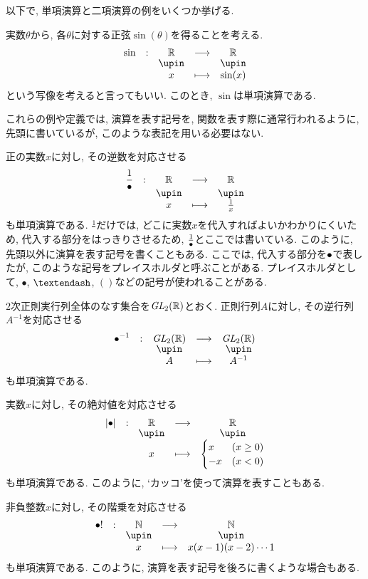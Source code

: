 以下で, 単項演算と二項演算の例をいくつか挙げる.
\begin{example}
  実数$\theta$から,
  各$\theta$に対する正弦$\sin(\theta)$を得ることを考える.
  \begin{align*}
    \shazo{\sin}
          {\RR}{\RR}
          {x}{\sin(x)}
  \end{align*}
  という写像を考えると言ってもいい.
  このとき, $\sin$は単項演算である.  
\end{example}
これらの例や定義では, 演算を表す記号を,
関数を表す際に通常行われるように,
先頭に書いているが,
このような表記を用いる必要はない.
\begin{example}
  正の実数$x$に対し, その逆数を対応させる
  \begin{align*}
    \shazo{\frac{1}{\tofu}}
          {\RR}{\RR}
          {x}{\frac{1}{x}}
  \end{align*}
  も単項演算である.
  $\frac{1}{}$だけでは, どこに実数$x$を代入すればよいかわかりにくいため,
  代入する部分をはっきりさせるため,
  $\frac{1}{{\bullet}}$とここでは書いている.
  このように, 先頭以外に演算を表す記号を書くこともある.
  ここでは, 代入する部分を${\bullet}$で表したが,
  このような記号をプレイスホルダと呼ぶことがある.
  プレイスホルダとして,
  $\bullet$, $\textendash$, $()$などの記号が使われることがある.
\end{example}
\begin{example}
  $2$次正則実行列全体のなす集合を$\textit{GL}_2(\mathbb{R})$とおく.
  正則行列$A$に対し, その逆行列$A^{-1}$を対応させる
  \begin{align*}
    \shazo{\tofu^{-1}}
          {\GL_2(\RR)}{\GL_2(\RR)}
          {A}{{A}^{-1}}
  \end{align*}
  も単項演算である.
\end{example}
\begin{example}
  実数$x$に対し, その絶対値を対応させる
  \begin{align*}
    \shazo{|\tofu|}
          {\RR}{\RR}
          {x}{\begin{cases}x&(x\geq 0)\\-x&(x<0)\end{cases}}
  \end{align*}
  も単項演算である.
  このように, `カッコ'を使って演算を表すこともある.
\end{example}
\begin{example}
  非負整数$x$に対し, その階乗を対応させる
  \begin{align*}
    \shazo{\tofu !}
          {\NN}{\NN}
          {x}{x(x-1)(x-2)\cdots 1}
  \end{align*}
  も単項演算である.
  このように, 演算を表す記号を後ろに書くような場合もある.
\end{example}
